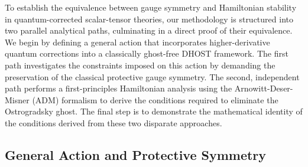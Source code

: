 \documentclass[twocolumn]{aastex631}
\begin{document}
To establish the equivalence between gauge symmetry and Hamiltonian stability in quantum-corrected scalar-tensor theories, our methodology is structured into two parallel analytical paths, culminating in a direct proof of their equivalence. We begin by defining a general action that incorporates higher-derivative quantum corrections into a classically ghost-free DHOST framework. The first path investigates the constraints imposed on this action by demanding the preservation of the classical protective gauge symmetry. The second, independent path performs a first-principles Hamiltonian analysis using the Arnowitt-Deser-Misner (ADM) formalism to derive the conditions required to eliminate the Ostrogradsky ghost. The final step is to demonstrate the mathematical identity of the conditions derived from these two disparate approaches.

\subsection{General Action and Protective Symmetry}
\end{document}
